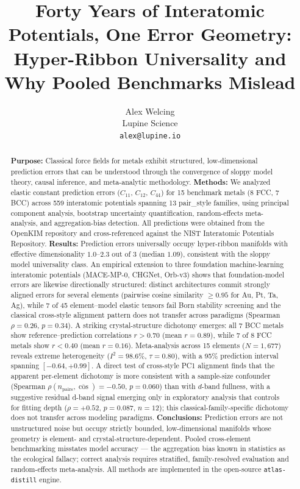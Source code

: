 \documentclass[twocolumn,9pt]{extarticle}
\begin{document}
\title{\bfseries Forty Years of Interatomic Potentials, One Error Geometry: Hyper-Ribbon Universality and Why Pooled Benchmarks Mislead}
\author{Alex Welcing\\
\small Lupine Science\\
\small \texttt{alex@lupine.io}}
\date{}

\begin{abstract}
\noindent\textbf{Purpose:} Classical force fields for metals exhibit structured, low-dimensional prediction errors that can be understood through the convergence of sloppy model theory, causal inference, and meta-analytic methodology.
\textbf{Methods:} We analyzed elastic constant prediction errors ($C_{11}$, $C_{12}$, $C_{44}$) for 15 benchmark metals (8 FCC, 7 BCC) across 559 interatomic potentials spanning 13 pair\_style families, using principal component analysis, bootstrap uncertainty quantification, random-effects meta-analysis, and aggregation-bias detection. All predictions were obtained from the OpenKIM repository and cross-referenced against the NIST Interatomic Potentials Repository.
\textbf{Results:} Prediction errors universally occupy hyper-ribbon manifolds with effective dimensionality $1.0$--$2.3$ out of 3 (median $1.09$), consistent with the sloppy model universality class. An empirical extension to three foundation machine-learning interatomic potentials (MACE-MP-0, CHGNet, Orb-v3) shows that foundation-model errors are likewise directionally structured: distinct architectures commit strongly aligned errors for several elements (pairwise cosine similarity $\geq 0.95$ for Au, Pt, Ta, Ag), while 7 of 45 element--model elastic tensors fail Born stability screening and the classical cross-style alignment pattern does not transfer across paradigms (Spearman $\rho = 0.26$, $p = 0.34$). A striking crystal-structure dichotomy emerges: all 7 BCC metals show reference--prediction correlations $r>0.70$ (mean $r=0.89$), while 7 of 8 FCC metals show $r<0.40$ (mean $r=0.16$). Meta-analysis across 15 elements ($N=1{,}677$) reveals extreme heterogeneity ($I^2=98.6\%$, $\tau=0.80$), with a 95\% prediction interval spanning $[-0.64, +0.99]$. A direct test of cross-style PC1 alignment finds that the apparent per-element dichotomy is more consistent with a sample-size confounder (Spearman $\rho(n_{\text{pairs}}, \overline{\cos}) = -0.50$, $p = 0.060$) than with $d$-band fullness, with a suggestive residual d-band signal emerging only in exploratory analysis that controls for fitting depth ($\rho = +0.52$, $p = 0.087$, $n=12$); this classical-family-specific dichotomy does not transfer across modeling paradigms.
\textbf{Conclusions:} Prediction errors are not unstructured noise but occupy strictly bounded, low-dimensional manifolds whose geometry is element- and crystal-structure-dependent. Pooled cross-element benchmarking misstates model accuracy --- the aggregation bias known in statistics as the ecological fallacy; correct analysis requires stratified, family-resolved evaluation and random-effects meta-analysis. All methods are implemented in the open-source \texttt{atlas-distill} engine.
\end{abstract}
\end{document}
